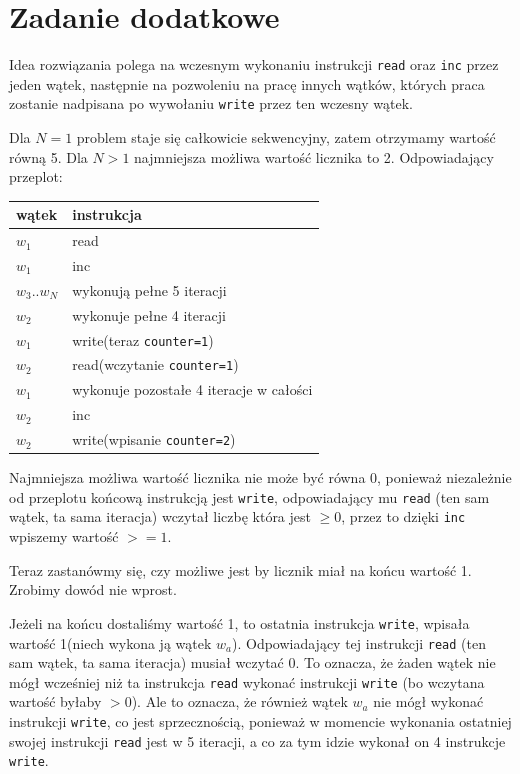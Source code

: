 \documentclass[11pt]{article}
\begin{document}
\section*{Zadanie dodatkowe}
\label{sec:org543969a}
Idea rozwiązania polega na wczesnym wykonaniu instrukcji \texttt{read} oraz \texttt{inc} przez jeden wątek,
następnie na pozwoleniu na pracę innych wątków, których praca zostanie nadpisana
po wywołaniu \texttt{write} przez ten wczesny wątek.


Dla \(N=1\) problem staje się całkowicie sekwencyjny, zatem otrzymamy wartość równą 5.
Dla \(N > 1\) najmniejsza możliwa wartość licznika to 2.
Odpowiadający przeplot:

\begin{center}
\begin{tabular}{ll}
wątek & instrukcja\\
\hline
\(w_1\) & read\\
\(w_1\) & inc\\
\(w_3\)..\(w_N\) & wykonują pełne 5 iteracji\\
\(w_2\) & wykonuje pełne 4 iteracji\\
\(w_1\) & write(teraz \texttt{counter=1})\\
\(w_2\) & read(wczytanie \texttt{counter=1})\\
\(w_1\) & wykonuje pozostałe 4 iteracje w całości\\
\(w_2\) & inc\\
\(w_2\) & write(wpisanie \texttt{counter=2})\\
\end{tabular}
\end{center}


Najmniejsza możliwa wartość licznika nie może być równa 0,
ponieważ niezależnie od przeplotu końcową instrukcją jest \texttt{write},
odpowiadający mu \texttt{read} (ten sam wątek, ta sama iteracja) wczytał liczbę
która jest \(\ge 0\), przez to dzięki \texttt{inc} wpiszemy wartość \(>=1\).

Teraz zastanówmy się, czy możliwe jest by licznik miał na końcu wartość 1.
Zrobimy dowód nie wprost.

Jeżeli na końcu dostaliśmy wartość 1, to ostatnia instrukcja \texttt{write}, wpisała
wartość 1(niech wykona ją wątek \(w_{a}\)).  Odpowiadający tej instrukcji \texttt{read}
(ten sam wątek, ta sama iteracja) musiał wczytać 0. To oznacza, że żaden wątek
nie mógł wcześniej niż ta instrukcja \texttt{read} wykonać instrukcji \texttt{write} (bo wczytana
wartość byłaby \(> 0\)). Ale to oznacza, że również wątek \(w_a\) nie mógł wykonać
instrukcji \texttt{write}, co jest sprzecznością, ponieważ w momencie wykonania ostatniej
swojej instrukcji \texttt{read} jest w 5 iteracji, a co za tym idzie wykonał on 4 instrukcje \texttt{write}.
\end{document}
